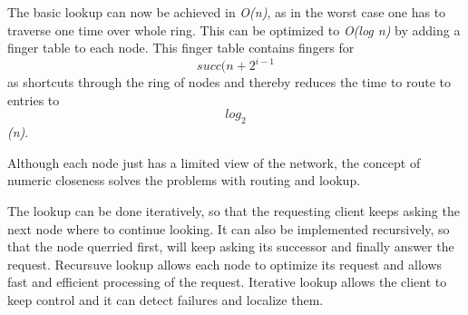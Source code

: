 	The basic lookup can now be achieved in \textit{O(n)},
	as in the worst case one has to traverse one time over whole ring.
	This can be optimized to \textit{O(log n)} by adding a finger table to each node.
	This finger table contains fingers for $$succ(n+2^{i-1}$$ as shortcuts through the ring of nodes
	and thereby reduces the time to route to entries to \textit{$$log_2$$(n)}.

	Although each node just has a limited view of the network,
	the concept of numeric closeness solves the problems with routing and lookup.
	
	The lookup can be done iteratively,
	so that the requesting client keeps asking the next node where to continue looking.
	It can also be implemented recursively,
	so that the node querried first,
	will keep asking its successor and finally answer the request.
	Recursuve lookup allows each node to optimize its request
	and allows fast and efficient processing of the request.
	Iterative lookup allows the client to keep control
	and it can detect failures and localize them.


